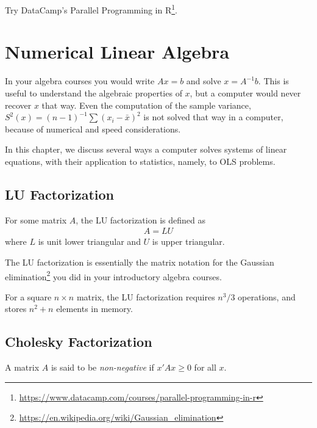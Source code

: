 \documentclass[]{book}
\renewcommand{\href}[2]{#2\footnote{\url{#1}}}
\theoremstyle{definition}
\theoremstyle{definition}
\theoremstyle{definition}
\theoremstyle{remark}
\let\BeginKnitrBlock\begin \let\EndKnitrBlock\end
\begin{document}
Try DataCamp's \href{https://www.datacamp.com/courses/parallel-programming-in-r}{Parallel Programming in R}.

\hypertarget{algebra}{%
\chapter{Numerical Linear Algebra}\label{algebra}}

In your algebra courses you would write \(Ax=b\) and solve \(x=A^{-1}b\).
This is useful to understand the algebraic properties of \(x\), but a computer would never recover \(x\) that way.
Even the computation of the sample variance, \(S^2(x)=(n-1)^{-1}\sum (x_i-\bar x )^2\) is not solved that way in a computer, because of numerical and speed considerations.

In this chapter, we discuss several ways a computer solves systems of linear equations, with their application to statistics, namely, to OLS problems.

\hypertarget{lu-factorization}{%
\section{LU Factorization}\label{lu-factorization}}

\BeginKnitrBlock{definition}[LU Factorization]
\protect\hypertarget{def:lu}{}{\label{def:lu} {} }For some matrix \(A\), the LU factorization is defined as
\begin{align}
 A = L U 
\end{align}
where \(L\) is unit lower triangular and \(U\) is upper triangular.
\EndKnitrBlock{definition}

The LU factorization is essentially the matrix notation for the \href{https://en.wikipedia.org/wiki/Gaussian_elimination}{Gaussian elimination} you did in your introductory algebra courses.

For a square \(n \times n\) matrix, the LU factorization requires \(n^3/3\) operations, and stores \(n^2+n\) elements in memory.

\hypertarget{cholesky-factorization}{%
\section{Cholesky Factorization}\label{cholesky-factorization}}

\BeginKnitrBlock{definition}[Non Negative Matrix]
\protect\hypertarget{def:nonnegative}{}{\label{def:nonnegative} {} }A matrix \(A\) is said to be \emph{non-negative} if \(x'Ax \geq 0\) for all \(x\).
\EndKnitrBlock{definition}
\end{document}
